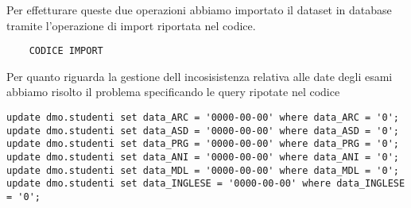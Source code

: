 \documentclass[12pt]{article}
\begin{document}
Per effetturare queste due operazioni abbiamo importato il dataset in database tramite l'operazione di import riportata nel codice.
\begin{lstlisting}
	CODICE IMPORT
\end{lstlisting}
Per quanto riguarda la gestione dell incosisistenza relativa alle date degli esami abbiamo risolto il problema specificando le query ripotate nel codice
\begin{lstlisting}
update dmo.studenti set data_ARC = '0000-00-00' where data_ARC = '0'; 
update dmo.studenti set data_ASD = '0000-00-00' where data_ASD = '0'; 
update dmo.studenti set data_PRG = '0000-00-00' where data_PRG = '0'; 
update dmo.studenti set data_ANI = '0000-00-00' where data_ANI = '0'; 
update dmo.studenti set data_MDL = '0000-00-00' where data_MDL = '0';
update dmo.studenti set data_INGLESE = '0000-00-00' where data_INGLESE = '0';
\end{lstlisting}
\end{document}
